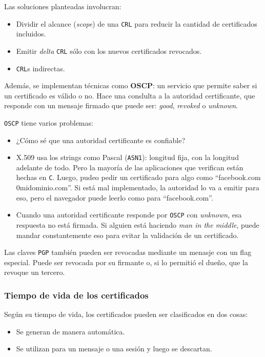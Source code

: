 Las soluciones planteadas involucran: 
\begin{itemize}
	\item Dividir el alcance (\emph{scope}) de una \texttt{CRL} para reducir la cantidad de certificados incluidos.
	\item Emitir \emph{delta} \texttt{CRL} sólo con los nuevos certificados revocados.
	\item \texttt{CRL}s indirectas.
\end{itemize}

Además, se implementan técnicas como \textbf{OSCP}: un servicio que permite saber si un certificado es válido o no. Hace una conslulta a la autoridad certificante, que responde con un mensaje firmado que puede ser: \emph{good}, \emph{revoked} o \emph{unknown}.

\texttt{OSCP} tiene varios problemas:
\begin{itemize}
	\item ¿Cómo sé que una autoridad certificante es confiable?
	\item X.509 usa los strings como Pascal (\texttt{ASN1}): longitud fija, con la longitud adelante de todo. Pero la mayoría de las aplicaciones que verifican están hechas en \texttt{C}. Luego, pudeo pedir un certificado para algo como ``facebook.com\\0midominio.com''. Si está mal implementado, la autoridad lo va a emitir para eso, pero el navegador puede leerlo como para ``facebook.com''.
	\item Cuando una autoridad certificante responde por \texttt{OSCP} con \emph{unknown}, esa respuesta no está firmada. Si alguien está haciendo \emph{man in the middle}, puede mandar constantemente eso para evitar la validación de un certificado.
\end{itemize}


Las claves \texttt{PGP} también pueden ser revocadas mediante un menasje con un flag especial. Puede ser revocada por su firmante o, si lo permitió el dueño, que la revoque un tercero.

\subsubsection{Tiempo de vida de los certificados}
Según su tiempo de vida, los certificados pueden ser clasificados en dos cosas:
\begin{itemize}
	\item Se generan de manera automática.
	\item Se utilizan para un mensaje o una sesión y luego se descartan.
\end{itemize}

